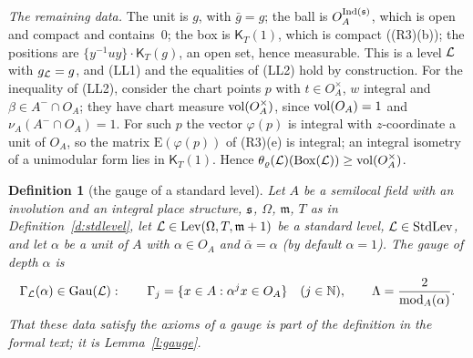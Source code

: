 \documentclass[11pt,a4paper]{article}
\makeatletter
\newcommand{\m}[1]{\mbox{$#1$}}        %
\theoremstyle{plainx}
\theoremstyle{uprightx}
\newtheorem{definition}[theorem]{Definition}
\renewenvironment{proof}[1][Proof]{\par\pushQED{\qed}\normalfont\topsep0pt\partopsep0pt
  \trivlist\item[\hskip\labelsep\itshape #1.]\ignorespaces}{\popQED\endtrivlist\@endpefalse}
\newcommand{\modA}{\operatorname{mod}_A}              %
\newcommand{\gL}[1]{g_{#1}}                           %
\newcommand{\BoxL}[1]{\operatorname{Box}(#1)}         %
\newcommand{\Levels}[3]{\operatorname{Lev}(#1,#2,#3)} %
\newcommand{\floorMeasure}[2]{\theta_{#2}(#1)}        %
\newcommand{\Gauges}[1]{\operatorname{Gau}(#1)}       %
\newcommand{\uLev}[2]{\mathsf{K}_{#2}(#1)}                     %
\newcommand{\Inp}[1]{\textup{(#1)}}
\makeatother
\begin{document}
\begin{proof}[Proof of Theorem E]
\emph{The remaining data.} The unit is $g$, with $\bar g=g$; the ball is $O_A^{\operatorname{Ind}(\mathfrak{s})}$, which is open and compact and
contains~$0$; the box is $\uLev{1}{T}$, which is compact (\Inp{R3}(b)); the positions are
$\{y^{-1}uy\}\cdot\uLev{g}{T}$, an open set, hence measurable. This is a level $\mathcal{L}$ with $\gL{\cL}=g$, and (LL1) and
the equalities of (LL2) hold by construction. For the inequality of (LL2), consider the chart points $p$ with
$t\in O_A^{\times}$, $w$ integral and $\beta\in A^{-}\cap O_A$; they have chart measure $\operatorname{vol}(O_A^{\times})$, since
$\operatorname{vol}(O_A)=1$ and $\nu_A(A^{-}\cap O_A)=1$. For such $p$ the vector $\varphi(p)$ is integral with $z$-coordinate a
unit of $O_A$, so the matrix $\mathrm{E}(\varphi(p))$ of \Inp{R3}(e) is integral; an integral isometry of a
unimodular form lies in $\uLev{1}{T}$. Hence $\floorMeasure{\cL}{\varrho}(\BoxL{\cL})\ge\vol(O_A^{\times})$.
\end{proof}

\begin{definition}[the gauge of a standard level]\label{d:gauge}
Let $A$ be a semilocal field with an involution and an integral place structure, $\mathfrak{s}$, $\Omega$, $\mathfrak{m}$, $T$
as in Definition~\ref{d:stdlevel}, let $\cL\in\Levels{\Omega}{T}{\mathfrak{m}+1}$ be a standard level, \m{\IsStd{\cL}}, and
let $\alpha$ be a unit of $A$ with $\alpha\in O_A$ and $\bar\alpha=\alpha$ (by default $\alpha=1$). The \emph{gauge of
depth $\alpha$} is
\[\stdg{\cL}{\alpha}\in\Gauges{\cL}:\qquad\Gamma_j=\{x\in A:\alpha^{j}x\in O_A\}\quad(j\in\NN),\qquad
\Lambda=\frac{2}{\modA(\alpha)} .\]
That these data satisfy the axioms of a gauge is part of the definition in the formal text; it is
Lemma~\ref{l:gauge}.
\end{definition}
\end{document}
